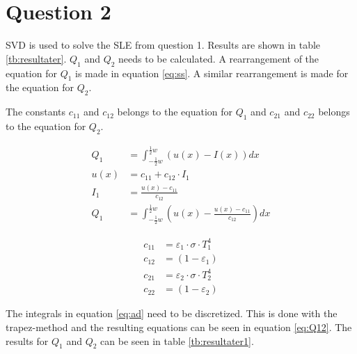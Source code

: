 \newpage
\section*{Question 2}
SVD is used to solve the SLE from question 1. Results are shown in table \ref{tb:resultater}.
$Q_1$ and $Q_2$ needs to be calculated. A rearrangement of the equation for $Q_1$ is made in equation \ref{eq:ss}.	A similar rearrangement is made for the equation for $Q_2$.

The constants \( c_{11} \) and \( c_{12} \) belongs to the equation for \( Q_1 \) and \( c_{21} \) and \( c_{22} \) belongs to the equation for \( Q_2 \).

\begin{equation}
\begin{align*}
Q_{ 1 }&=\int _{ -\frac { 1 }{ 2 } w }^{ \frac { 1 }{ 2 } w } \left( { u }\left( x \right) -I\left( x \right)  \right) { dx }\\ 
u\left( x \right) &={ c }_{ 11 }+{ c }_{ 12 }\cdot I_{ 1 }\\ 
{ I }_{ 1 }&=\frac { u\left( x \right) -{ c }_{ 11 } }{ { c }_{ 12 } } \\ 
Q_{ 1 }&=\int _{ -\frac { 1 }{ 2 } w }^{ \frac { 1 }{ 2 } w } \left( { u }\left( x \right) -\frac { u\left( x \right) -{ c }_{ 11 } }{ { c }_{ 12 } }  \right) { dx }
\end{align*}
\label{eq:ss}
\end{equation}

\begin{equation}
\begin{align*}
{ c }_{ 11 }&={ \varepsilon  }_{ 1 }\cdot \sigma \cdot { T }_{ 1 }^{ 4 }\\ 
{ c }_{ 12 }&=\left( 1-{ \varepsilon  }_{ 1 } \right) \\ 
{ c }_{ 21 }&={ \varepsilon  }_{ 2 }\cdot \sigma \cdot { T }_{ 2 }^{ 4 }\\ 
{ c }_{ 22 }&=\left( 1-{ \varepsilon  }_{ 2 } \right) 
\end{align*}
\label{eq:ad}
\end{equation}

The integrals in equation \ref{eq:ad} need to be discretized. This is done with the trapez-method and the resulting equations can be seen in equation \ref{eq:Q12}. The results for $Q_1$ and $Q_2$ can be seen in table \ref{tb:resultater1}.

